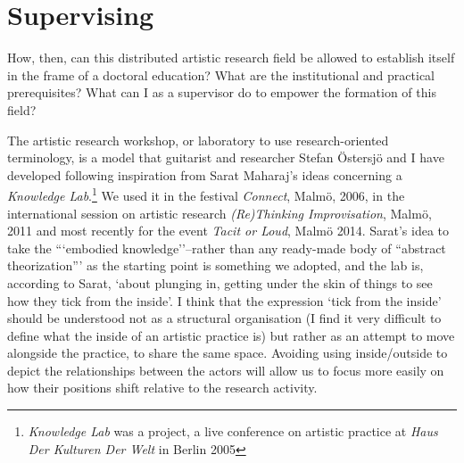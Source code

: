 \documentclass[12pt]{article}
\begin{document}
\section*{Supervising}

How, then, can this distributed artistic research field be allowed to establish itself in the frame of a doctoral education? What are the institutional and practical prerequisites? What can I as a supervisor do to empower the formation of this field? 


The artistic research workshop, or laboratory to use research-oriented terminology, is a model that guitarist and researcher Stefan Östersjö and I have developed following inspiration from Sarat Maharaj's ideas concerning a \emph{Knowledge Lab}.\footnote{\emph{Knowledge Lab} was a project, a live conference on artistic practice at \emph{Haus Der Kulturen Der Welt} in Berlin 2005} We used it in the festival \emph{Connect}, Malmö, 2006, in the international session on artistic research \emph{(Re)Thinking Improvisation}, Malmö, 2011 and most recently for the event\emph{ Tacit or Loud}, Malmö 2014. Sarat's idea to take the ```embodied knowledge''--rather than any ready-made body of ``abstract theorization''' as the starting point is something we adopted, and the lab is, according to Sarat, `about plunging in, getting under the skin of things to see how they tick from the inside'. I think that the expression `tick from the inside' should be understood not as a structural organisation (I find it very difficult to define what the inside of an artistic practice is) but rather as an attempt to move alongside the practice, to share the same space. Avoiding using inside/outside to depict the relationships between the actors will allow us to focus more easily on how their positions shift relative to the research activity.
\end{document}
